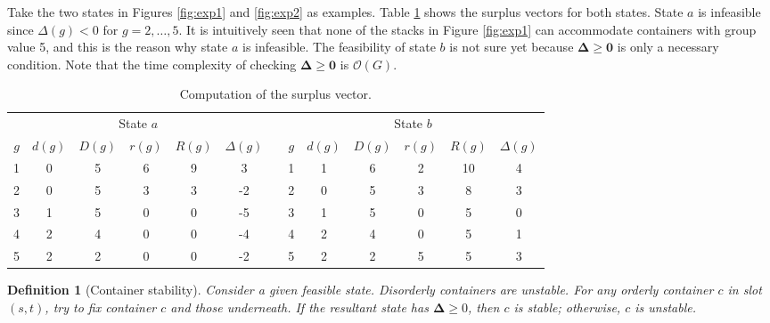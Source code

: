 \documentclass[review,3p,times,12pt,number]{elsarticle}\usepackage{amsmath}\usepackage{amssymb}
\newtheorem{definition}{Definition}
\begin{document}
Take the two states in Figures \ref{fig:exp1} and \ref{fig:exp2} as examples.
Table \ref{tab:feasible} shows the surplus vectors for both states. State $a$ is infeasible since $\Delta(g)<0$ for $g=2,\dots,5$. It is intuitively seen that none of the stacks in Figure \ref{fig:exp1} can accommodate containers with group value 5, and this is the reason why state $a$ is infeasible.
The feasibility of state $b$ is not sure yet because $\boldsymbol{\Delta}\ge \boldsymbol {0}$ is only a necessary condition. Note that the time complexity of checking $\boldsymbol{\Delta}\ge \boldsymbol{0}$ is $\mathcal O(G)$.

\begin{table}[htbp]
\caption{Computation of the surplus vector.}
\centering

\begin{tabular}{|c|c|c|c|c|c| c |c|c|c|c|c|c|}
\cline{1-6}
\cline{8-13}
\multicolumn{6}{|c|}{State $a$} & \multicolumn{1}{c}{}& \multicolumn{6}{|c|}{State $b$}\\
\cline{1-6}
\cline{8-13}
$g$ & $d(g)$ & $D(g)$ & $r(g)$ & $R(g)$ & $\Delta(g)$ && $g$ & $d(g)$ & $D(g)$ & $r(g)$ & $R(g)$ & $\Delta(g)$\\
\cline{1-6}
\cline{8-13}
1   & 0      & 5      & 6      & 9      & 3           && 1   &  1     & 6       & 2      & 10     & 4\\
2   & 0      & 5      & 3      & 3      & -2          && 2   &  0     & 5       & 3      & 8      &  3\\
3   & 1      & 5      & 0      & 0      & -5          && 3   &  1     & 5       & 0      & 5      &  0\\
4   & 2      & 4      & 0      & 0      & -4          && 4   &  2     & 4       & 0      & 5      &  1\\
5   & 2      & 2      & 0      & 0      & -2          && 5   &  2     & 2       & 5      & 5      &  3\\
\cline{1-6}
\cline{8-13}
\end{tabular}
\label{tab:feasible}
\end{table}



\begin{definition}[Container stability]
Consider a given feasible state. Disorderly containers are unstable. For any orderly container $c$ in slot $(s,t)$, try to fix container $c$ and those underneath. If the resultant state has $\boldsymbol{\Delta}\ge 0$, then $c$ is stable; otherwise, $c$ is unstable.
\end{definition}
\end{document}
